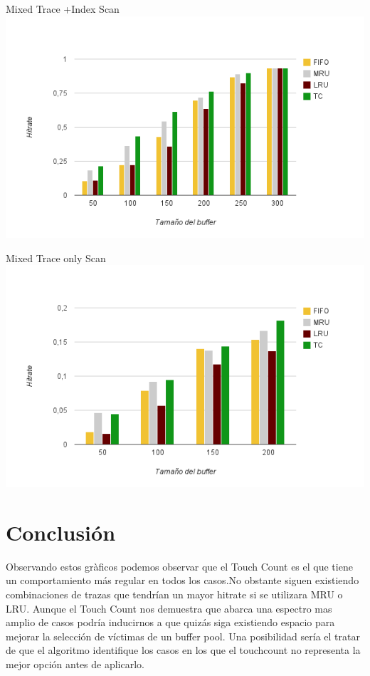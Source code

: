 Mixed Trace +Index Scan\\
\includegraphics[scale=.80]{grafico2-2}

Mixed Trace only Scan\\
\includegraphics[scale=.80]{grafico3}

\section{Conclusión}

Observando estos gràficos podemos observar que el Touch Count es el que tiene un comportamiento más regular en todos los casos.No obstante siguen existiendo combinaciones de trazas que tendrían un mayor hitrate si se utilizara MRU o LRU. Aunque el Touch Count nos demuestra que abarca una espectro mas amplio de casos podría inducirnos a que quizás siga existiendo espacio para mejorar la selección de
víctimas de un buffer pool. Una posibilidad sería el tratar de que el algoritmo identifique los casos en los que el touchcount no representa la mejor opción antes de aplicarlo.



